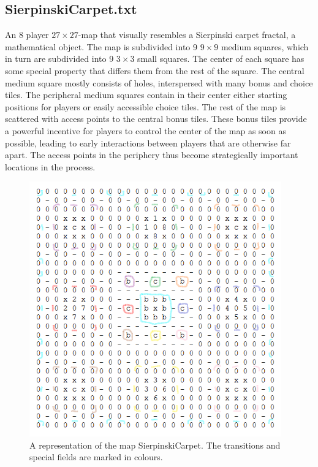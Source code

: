 \documentclass[a4paper,12pt]{article}
\begin{document}
\subsection{SierpinskiCarpet.txt}
An 8 player $27\times27$-map that visually resembles a Sierpinski carpet fractal, a mathematical object. The map is subdivided into 9 $9\times9$ medium squares, which in turn are subdivided into 9 $3\times3$ small squares. The center of each square has some special property that differs them from the rest of the square. The central medium square mostly consists of holes, interspersed with many bonus and choice tiles. The peripheral medium squares contain in their center either starting positions for players or easily accessible choice tiles. The rest of the map is scattered with access points to the central bonus tiles. These bonus tiles provide a powerful incentive for players to control the center of the map as soon as possible, leading to early interactions between players that are otherwise far apart. The access points in the periphery thus become strategically important locations in the process.



\begin{figure}[H]
    \centering
    \includegraphics[height=11cm]{pictures/assignment1/SierpinskiCarpet.PNG}
    \caption{A representation of the map SierpinskiCarpet. The transitions and special fields are marked in colours.}
    \label{fig:SierpinskiCarpet}
\end{figure}
\end{document}
